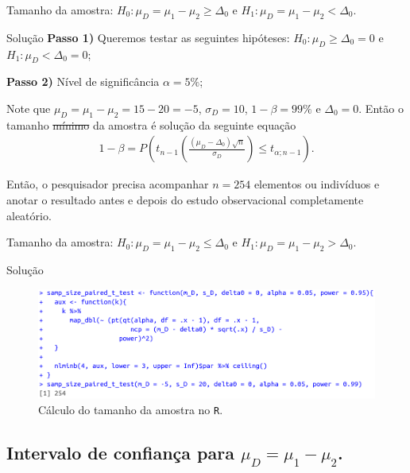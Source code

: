 \documentclass[9pt]{beamer}
\begin{document}
\begin{frame}{Tamanho da amostra: $H_0:\mu_D = \mu_1 - \mu_2 \geq \Delta_0$ e $H_1:\mu_D =  \mu_1 - \mu_2 < \Delta_0$.}

\begin{block}{Solução}
	\textbf{Passo 1)} Queremos testar as seguintes hipóteses: $H_0: \mu_D \geq \Delta_0 = 0$ e $H_1: \mu_D < \Delta_0 = 0$;
	
	\textbf{Passo 2)} Nível de significância $\alpha=5\%$;
	
	Note que $\mu_D = \mu_1 - \mu_2 = 15 - 20 = -5$, $\sigma_D = 10$, $1-\beta=99\%$ e $\Delta_0=0$. Então o tamanho \sout{mínimo} da amostra é solução da seguinte equação
	\begin{align*}
	1-\beta = P\left( t_{n-1}\left( \frac{(\mu_D - \Delta_0)\sqrt{n}}{\sigma_D} \right) \leq t_{\alpha;n-1} \right).
	\end{align*}
\end{block}

Então, o pesquisador precisa acompanhar $n=254$ elementos ou indivíduos e anotar o resultado antes e depois do estudo observacional completamente aleatório.
\end{frame}

\begin{frame}{Tamanho da amostra: $H_0:\mu_D = \mu_1 - \mu_2 \leq \Delta_0$ e $H_1:\mu_D =  \mu_1 - \mu_2 > \Delta_0$.}

\normalsize

\begin{block}{Solução}
	\begin{figure}[htbp]
		\centering
		\includegraphics[width=\linewidth]{figures/samp-size-paired-t-test-unilateral-h1-lower.png}
		\caption{Cálculo do tamanho da amostra no \texttt{R}.}
	\end{figure}
	
\end{block}

\end{frame}

\subsection{Intervalo de confiança para $\mu_D = \mu_1 - \mu_2$.}
\end{document}
